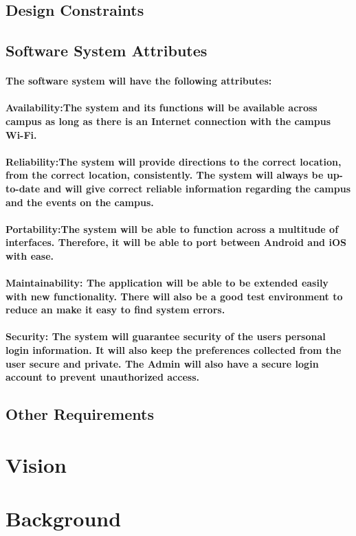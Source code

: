 \documentclass{article}
\begin{document}
        \subsection{Design Constraints}
        \subsection{Software System Attributes}
		\paragraph{		
			The software system will have the following attributes:
} 

		\paragraph{Availability:The system and its functions will be available across campus as long as there is an Internet connection with the campus Wi-Fi. 
}
		\paragraph{Reliability:The system will provide directions to the correct location, from the correct location, consistently. The system will always be up-to-date and will give correct reliable information regarding the campus and the events on the campus.
}
		\paragraph{Portability:The system will be able to function across a multitude of interfaces. Therefore, it will be able to port between Android and iOS with ease. 
}
		\paragraph{Maintainability: The application will be able to be extended easily with new functionality. There will also be a good test environment to reduce an make it easy to find system errors.  }

		\paragraph{Security: The system will guarantee security of the users personal login information. It will also keep the preferences collected from the user secure and private. The Admin will also have a secure login account to prevent unauthorized access.}
        \subsection{Other Requirements}
	
	\section{Vision}


	\section{Background}
	
\end{document}
